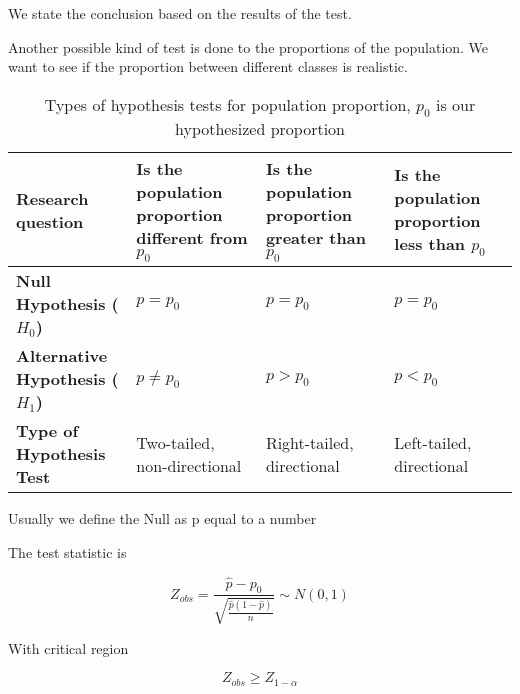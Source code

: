 \vspace{10pt}

We state the conclusion based on the results of the test.

\vspace{20pt}

Another possible kind of test is done to the proportions of the population.
We want to see if the proportion between different classes is realistic.

\begin{table}[h!]
\centering
\begin{tabular}{|p{3cm}|p{3.5cm}|p{3.5cm}|p{3.5cm}|}
\hline
\textbf{Research question} & Is the population \newline proportion different from $p_0$ & Is the population \newline proportion greater than $p_0$ & Is the population \newline proportion less than $p_0$ \\
\hline
\textbf{Null Hypothesis ($H_0$)} & $p = p_0$ & $p = p_0$ & $p = p_0$ \\
\hline
\textbf{Alternative Hypothesis ($H_1$)} & $p \neq p_0$ & $p > p_0$ & $p < p_0$ \\
\hline
\textbf{Type of Hypothesis Test} & Two-tailed, \newline non-directional & Right-tailed, \newline directional & Left-tailed, \newline directional \\
\hline
\end{tabular}
\caption{Types of hypothesis tests for population proportion, $p_0$ is our hypothesized proportion}
\end{table}

\vspace{10pt}

Usually we define the Null as p equal to a number

\vspace{10pt}

The test statistic is

\begin{equation*}
    Z_{obs} = \frac{\hat{p}- p_0}{\sqrt{\frac{\hat{p}(1-\hat{p})}{n}}} \sim N(0,1)
\end{equation*}

With critical region

\begin{equation*}
    Z_{obs} \geq Z_{1 - \alpha}
\end{equation*}

